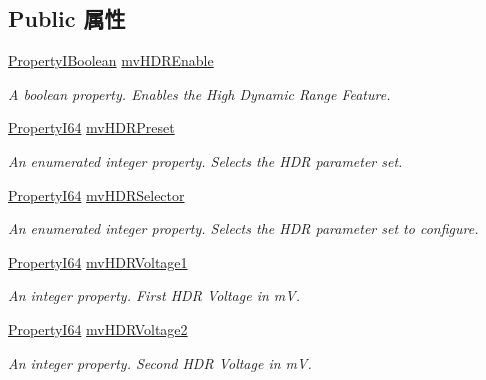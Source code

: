 \subsection*{Public 属性}
\begin{DoxyCompactItemize}
\item 
\hyperlink{group___common_interface_ga44f9437e24b21b6c93da9039ec6786aa}{Property\+I\+Boolean} \hyperlink{classmv_i_m_p_a_c_t_1_1acquire_1_1_gen_i_cam_1_1mv_h_d_r_control_a118715db2d996d5f7f3eb2839ef49959}{mv\+H\+D\+R\+Enable}
\begin{DoxyCompactList}\small\item\em A boolean property. Enables the High Dynamic Range Feature. \end{DoxyCompactList}\item 
\hyperlink{group___common_interface_ga81749b2696755513663492664a18a893}{Property\+I64} \hyperlink{classmv_i_m_p_a_c_t_1_1acquire_1_1_gen_i_cam_1_1mv_h_d_r_control_a905f7beff8d8e7bcf570cc5183a59726}{mv\+H\+D\+R\+Preset}
\begin{DoxyCompactList}\small\item\em An enumerated integer property. Selects the H\+D\+R parameter set. \end{DoxyCompactList}\item 
\hyperlink{group___common_interface_ga81749b2696755513663492664a18a893}{Property\+I64} \hyperlink{classmv_i_m_p_a_c_t_1_1acquire_1_1_gen_i_cam_1_1mv_h_d_r_control_a628e8bac6c8ed2e28342d9b1b03ddb56}{mv\+H\+D\+R\+Selector}
\begin{DoxyCompactList}\small\item\em An enumerated integer property. Selects the H\+D\+R parameter set to configure. \end{DoxyCompactList}\item 
\hyperlink{group___common_interface_ga81749b2696755513663492664a18a893}{Property\+I64} \hyperlink{classmv_i_m_p_a_c_t_1_1acquire_1_1_gen_i_cam_1_1mv_h_d_r_control_a0e8c9c8edd8049a51b178fbf9b67abfe}{mv\+H\+D\+R\+Voltage1}
\begin{DoxyCompactList}\small\item\em An integer property. First H\+D\+R Voltage in m\+V. \end{DoxyCompactList}\item 
\hyperlink{group___common_interface_ga81749b2696755513663492664a18a893}{Property\+I64} \hyperlink{classmv_i_m_p_a_c_t_1_1acquire_1_1_gen_i_cam_1_1mv_h_d_r_control_a5252640d82422084786ff3cf3851f0ad}{mv\+H\+D\+R\+Voltage2}
\begin{DoxyCompactList}\small\item\em An integer property. Second H\+D\+R Voltage in m\+V. \end{DoxyCompactList}\item 

\end{DoxyCompactItemize}
